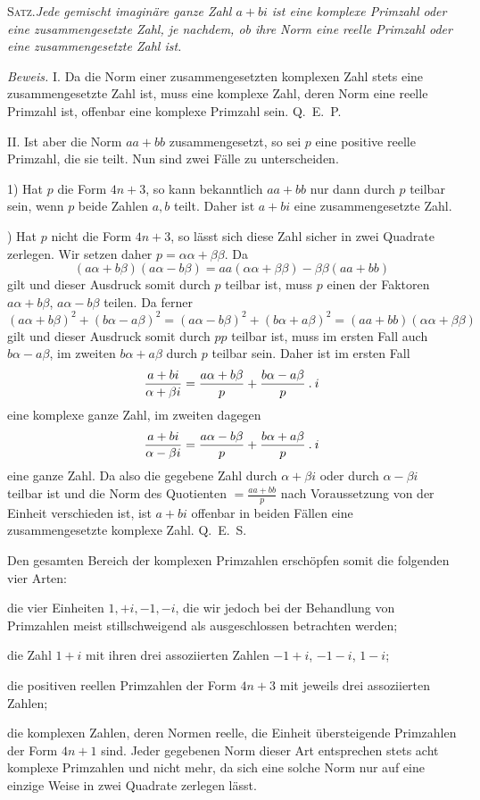 \textsc{Satz.}\quad\emph{Jede gemischt imaginäre ganze Zahl $a+bi$ ist eine komplexe Primzahl oder eine zusammengesetzte Zahl, je nachdem, ob ihre Norm eine reelle Primzahl oder eine zusammengesetzte Zahl ist.}

\emph{Beweis.} I. Da die Norm einer zusammengesetzten komplexen Zahl stets eine zusammengesetzte Zahl ist, muss eine komplexe Zahl, deren Norm eine reelle Primzahl ist, offenbar eine komplexe Primzahl sein. \mbox{Q. E. P.}

II. Ist aber die Norm $aa+bb$ zusammengesetzt, so sei $p$ eine positive reelle Primzahl, die sie teilt. Nun sind zwei Fälle zu unterscheiden.

1) Hat $p$ die Form $4n+3$, so kann bekanntlich $aa+bb$ nur dann durch $p$ teilbar sein, wenn $p$ beide Zahlen $a,b$ teilt. Daher ist $a+bi$ eine zusammengesetzte Zahl.

\begingroup{}) Hat $p$ nicht die Form $4n+3$, so lässt sich diese Zahl sicher in zwei Quadrate zerlegen. Wir setzen daher $p=\alpha\alpha+\beta\beta$. Da
\[
(a\alpha+b\beta)(a\alpha-b\beta)=aa(\alpha\alpha+\beta\beta)-\beta\beta(aa+bb)
\]
gilt und dieser Ausdruck somit durch $p$ teilbar ist, muss $p$ einen der Faktoren $a\alpha+b\beta$, $a\alpha-b\beta$ teilen. Da ferner
\[
(a\alpha+b\beta)^2+(b\alpha-a\beta)^2=(a\alpha-b\beta)^2+(b\alpha+a\beta)^2=(aa+bb)(\alpha\alpha+\beta\beta)
\]
gilt und dieser Ausdruck somit durch $pp$ teilbar ist, muss im ersten Fall auch $b\alpha-a\beta$, im zweiten $b\alpha+a\beta$ durch $p$ teilbar sein. Daher ist im ersten Fall
\[
\frac{a+bi}{\alpha+\beta i}=\frac{a\alpha+b\beta}{p}+\frac{b\alpha-a\beta}{p}\mathbin{.} i
\]
eine komplexe ganze Zahl, im zweiten dagegen
\[
\frac{a+bi}{\alpha-\beta i}=\frac{a\alpha-b\beta}{p}+\frac{b\alpha+a\beta}{p}\mathbin{.} i
\]
eine ganze Zahl. Da also die gegebene Zahl durch $\alpha+\beta i$ oder durch $\alpha-\beta i$ teilbar ist und die Norm des Quotienten $=\frac{aa+bb}{p}$ nach Voraussetzung von der Einheit verschieden ist, ist $a+bi$ offenbar in beiden Fällen eine zusammengesetzte komplexe Zahl. \mbox{Q. E. S.}\endgroup

%
Den gesamten Bereich der komplexen Primzahlen erschöpfen somit die folgenden vier Arten:

\begin{list}{}{\setlength{\leftmargin}{1.7em}\setlength{\labelwidth}{1.5em}\setlength{\labelsep}{.2em}}
\item[1)] die vier Einheiten $1,+i,-1,-i$, die wir jedoch bei der Behandlung von Primzahlen meist stillschweigend als ausgeschlossen betrachten werden;
\item[2)] die Zahl $1+i$ mit ihren drei assoziierten Zahlen $-1+i$, $-1-i$, $1-i$;
\item[3)] die positiven reellen Primzahlen der Form $4n+3$ mit jeweils drei assoziierten Zahlen;
\item[4)] die komplexen Zahlen, deren Normen reelle, die Einheit übersteigende Primzahlen der Form $4n+1$ sind. Jeder gegebenen Norm dieser Art entsprechen stets acht komplexe Primzahlen und nicht mehr, da sich eine solche Norm nur auf eine einzige Weise in zwei Quadrate zerlegen lässt.
\end{list}


